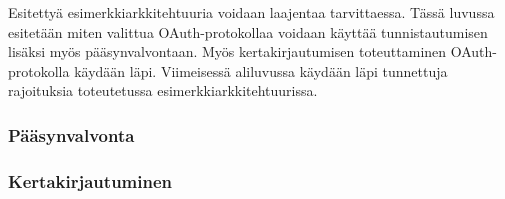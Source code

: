 Esitettyä esimerkkiarkkitehtuuria voidaan laajentaa tarvittaessa. Tässä luvussa esitetään miten valittua OAuth-protokollaa voidaan käyttää tunnistautumisen lisäksi myös pääsynvalvontaan. Myös kertakirjautumisen toteuttaminen OAuth-protokolla käydään läpi. Viimeisessä aliluvussa käydään läpi tunnettuja rajoituksia toteutetussa esimerkkiarkkitehtuurissa.

\subsubsection{Pääsynvalvonta}

\subsubsection{Kertakirjautuminen}

